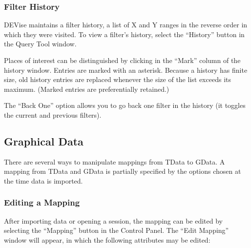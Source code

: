 \subsubsection{Filter History}

DEVise maintains a filter history, a list of X and Y ranges in the reverse order
in which they were visited. To view a filter's history, select the ``History'' button in the Query Tool window.

Places of interest can be distinguished by clicking in the ``Mark'' column of
the history window. Entries are marked with an asterisk.  Because a history has
finite size, old history entries are replaced whenever the size of the list
exceeds its maximum. (Marked entries are preferentially retained.)

The ``Back One'' option allows you to go back one filter in the history
(it toggles the current and previous filters).


\subsection{Graphical Data}

There are several ways to manipulate mappings from TData to GData. A mapping
from TData and GData is partially specified by the options chosen at the time
data is imported.

\subsubsection{Editing a Mapping}

After importing data or opening a session, the mapping can be edited by
selecting the ``Mapping'' button in the Control Panel. The ``Edit Mapping''
window will appear, in which the following attributes may be edited:

